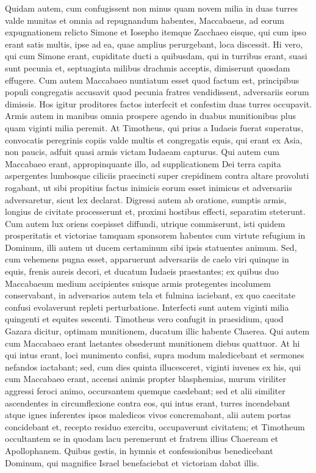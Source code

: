 \begin{biblechapter}
\verse Quidam autem, cum confugissent non minus quam novem milia in duas turres valde munitas et omnia ad repugnandum habentes,  
\verse Maccabaeus, ad eorum expugnationem relicto Simone et Iosepho itemque Zacchaeo eisque, qui cum ipso erant satis multis, ipse ad ea, quae amplius perurgebant, loca discessit. 
\verse Hi vero, qui cum Simone erant, cupiditate ducti a quibusdam, qui in turribus erant, suasi sunt pecunia et, septuaginta milibus drachmis acceptis, dimiserunt quosdam effugere. 
\verse Cum autem Maccabaeo nuntiatum esset quod factum est, principibus populi congregatis accusavit quod pecunia fratres vendidissent, adversariis eorum dimissis. 
\verse Hos igitur proditores factos interfecit et confestim duas turres occupavit. 
\verse Armis autem in manibus omnia prospere agendo in duabus munitionibus plus quam viginti milia peremit. 
\verse At Timotheus, qui prius a Iudaeis fuerat superatus, convocatis peregrinis copiis valde multis et congregatis equis, qui erant ex Asia, non paucis, adfuit quasi armis victam Iudaeam capturus. 
\verse Qui autem cum Maccabaeo erant, appropinquante illo, ad supplicationem Dei terra capita aspergentes lumbosque ciliciis praecincti 
\verse super crepidinem contra altare provoluti rogabant, ut sibi propitius factus inimicis eorum esset inimicus et adversariis adversaretur, sicut lex declarat. 
\verse Digressi autem ab oratione, sumptis armis, longius de civitate processerunt et, proximi hostibus effecti, separatim steterunt. 
\verse Cum autem lux oriens coepisset diffundi, utrique commiserunt, isti quidem prosperitatis et victoriae tamquam sponsorem habentes cum virtute refugium in Dominum, illi autem ut ducem certaminum sibi ipsis statuentes animum. 
\verse Sed, cum vehemens pugna esset, apparuerunt adversariis de caelo viri quinque in equis, frenis aureis decori, et ducatum Iudaeis praestantes; 
\verse ex quibus duo Maccabaeum medium accipientes suisque armis protegentes incolumem conservabant, in adversarios autem tela et fulmina iaciebant, ex quo caecitate confusi evolaverunt repleti perturbatione. 
\verse Interfecti sunt autem viginti milia quingenti et equites sescenti. 
\verse Timotheus vero confugit in praesidium, quod Gazara dicitur, optimam munitionem, ducatum illic habente Chaerea. 
\verse Qui autem cum Maccabaeo erant laetantes obsederunt munitionem diebus quattuor. 
\verse At hi qui intus erant, loci munimento confisi, supra modum maledicebant et sermones nefandos iactabant;  
\verse sed, cum dies quinta illucesceret, viginti iuvenes ex his, qui cum Maccabaeo erant, accensi animis propter blasphemias, murum viriliter aggressi feroci animo, occursantem quemque caedebant; 
\verse sed et alii similiter ascendentes in circumflexione contra eos, qui intus erant, turres incendebant atque ignes inferentes ipsos maledicos vivos concremabant, alii autem portas concidebant et, recepto residuo exercitu, occupaverunt civitatem; 
\verse et Timotheum occultantem se in quodam lacu peremerunt et fratrem illius Chaeream et Apollophanem. 
\verse Quibus gestis, in hymnis et confessionibus benedicebant Dominum, qui magnifice Israel benefaciebat et victoriam dabat illis. 
\end{biblechapter}

